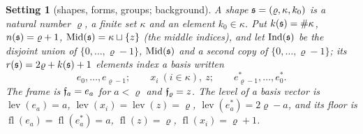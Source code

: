 \documentclass[11pt,a4paper]{article}
\theoremstyle{plainx}
\theoremstyle{uprightx}
\newtheorem{setting}[theorem]{Setting}          %
\newcommand{\fl}{\operatorname{fl}}
\newcommand{\lev}{\operatorname{lev}}
\begin{document}
\begin{setting}[shapes, forms, groups; background]\label{set:shape}
A \emph{shape} $\mathfrak{s}=(\varrho,\kappa,k_0)$ is a natural number $\varrho$, a finite set $\kappa$ and an element
$k_0\in\kappa$. Put $k(\mathfrak{s})=\#\kappa$, $n(\mathfrak{s})=\varrho+1$, $\operatorname{Mid}(\mathfrak{s})=\kappa\sqcup\{z\}$ (the \emph{middle
indices}), and let $\operatorname{Ind}(\mathfrak{s})$ be the disjoint union of $\{0,\dots,\varrho-1\}$, $\operatorname{Mid}(\mathfrak{s})$ and a second copy of
$\{0,\dots,\varrho-1\}$; its $r(\mathfrak{s})=2\varrho+k(\mathfrak{s})+1$ elements index a basis written
\[e_0,\dots,e_{\varrho-1};\qquad x_i\ (i\in\kappa),\ z;\qquad e^*_{\varrho-1},\dots,e^*_0 .\]
The \emph{frame} is $\mathfrak{f}_{a}=e_a$ for $a<\varrho$ and $\mathfrak{f}_{\varrho}=z$. The \emph{level} of a basis vector is
$\lev(e_a)=a$, $\lev(x_i)=\lev(z)=\varrho$, $\lev(e_a^*)=2\varrho-a$, and its \emph{floor} is
$\fl(e_a)=\fl(e_a^*)=a$, $\fl(z)=\varrho$, $\fl(x_i)=\varrho+1$.


\end{setting}
\end{document}
